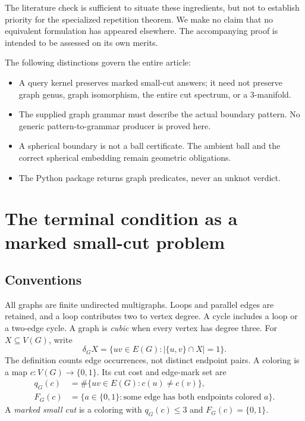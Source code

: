 \documentclass[11pt]{article}
\theoremstyle{remark}\newtheorem{remark}[theorem]{Remark}
\newcommand{\cut}{\delta}
\begin{document}
The literature check is sufficient to situate these ingredients, but not to establish priority for the specialized repetition theorem. We make no claim that no equivalent formulation has appeared elsewhere. The accompanying proof is intended to be assessed on its own merits.

The following distinctions govern the entire article:
\begin{itemize}[nosep]
\item A query kernel preserves marked small-cut answers; it need not preserve graph genus, graph isomorphism, the entire cut spectrum, or a 3-manifold.
\item The supplied graph grammar must describe the actual boundary pattern. No generic pattern-to-grammar producer is proved here.
\item A spherical boundary is not a ball certificate. The ambient ball and the correct spherical embedding remain geometric obligations.
\item The Python package returns graph predicates, never an unknot verdict.
\end{itemize}

\section{The terminal condition as a marked small-cut problem}
\subsection{Conventions}
All graphs are finite undirected multigraphs. Loops and parallel edges are retained, and a loop contributes two to vertex degree. A cycle includes a loop or a two-edge cycle. A graph is \emph{cubic} when every vertex has degree three. For $X\subseteq V(G)$, write
\[
 \cut_G X=\{uv\in E(G): |\{u,v\}\cap X|=1\}.
\]
The definition counts edge occurrences, not distinct endpoint pairs. A coloring is a map $c:V(G)\to\{0,1\}$. Its cut cost and edge-mark set are
\begin{align}
 q_G(c)&=\#\{uv\in E(G):c(u)\ne c(v)\},\\
 F_G(c)&=\{a\in\{0,1\}:\text{some edge has both endpoints colored }a\}.
\end{align}
A \emph{marked small cut} is a coloring with $q_G(c)\le3$ and $F_G(c)=\{0,1\}$.
\end{document}
